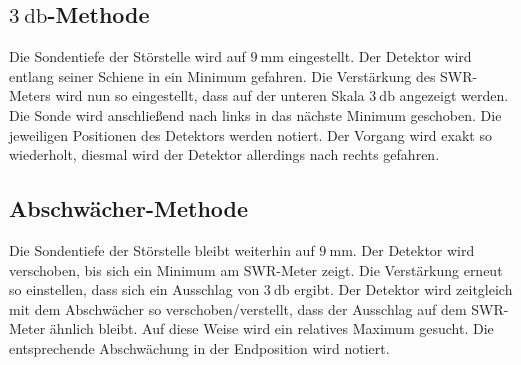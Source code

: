 \subsection{$\qty{3}{\decibel}$-Methode}
\label{subsec:3db_methode}

Die Sondentiefe der Störstelle wird auf $\qty{9}{\milli\metre}$ eingestellt. Der Detektor wird entlang seiner Schiene in ein Minimum gefahren. Die Verstärkung des SWR-Meters wird nun so eingestellt, dass auf der unteren Skala
$\qty{3}{\decibel}$ angezeigt werden. Die Sonde wird anschließend nach links in das nächste Minimum geschoben. Die jeweiligen Positionen des Detektors werden notiert. Der Vorgang wird exakt so wiederholt, diesmal wird der Detektor
allerdings nach rechts gefahren.

\subsection{Abschwächer-Methode}
\label{subsec:abschwächer}
Die Sondentiefe der Störstelle bleibt weiterhin auf $\qty{9}{\milli\metre}$. Der Detektor wird verschoben, bis sich ein Minimum am SWR-Meter zeigt. Die Verstärkung erneut so einstellen, dass sich ein Ausschlag von $\qty{3}{\decibel}$
ergibt. Der Detektor wird zeitgleich mit dem Abschwächer so verschoben/verstellt, dass der Ausschlag auf dem SWR-Meter ähnlich bleibt. Auf diese Weise wird ein relatives Maximum gesucht. Die entsprechende Abschwächung in der Endposition wird
notiert.